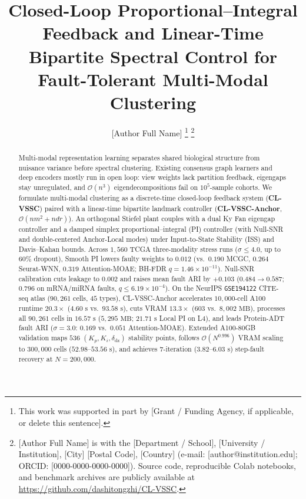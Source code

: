 \documentclass[journal]{IEEEtran}
\begin{document}
\title{Closed-Loop Proportional--Integral Feedback and Linear-Time Bipartite Spectral Control for Fault-Tolerant Multi-Modal Clustering}

\author{[Author Full Name]%
\thanks{This work was supported in part by [Grant / Funding Agency, if applicable, or delete this sentence].}%
\thanks{[Author Full Name] is with the [Department / School], [University / Institution], [City] [Postal Code], [Country] (e-mail: [author@institution.edu]; ORCID: [0000-0000-0000-0000]). Source code, reproducible Colab notebooks, and benchmark archives are publicly available at \url{https://github.com/dashitongzhi/CL-VSSC}.}}

\maketitle

\begin{abstract}
Multi-modal representation learning separates shared biological structure from nuisance variance before spectral clustering. Existing consensus graph learners and deep encoders mostly run in open loop: view weights lack partition feedback, eigengaps stay unregulated, and $\mathcal{O}(n^3)$ eigendecompositions fail on $10^5$-sample cohorts. We formulate multi-modal clustering as a discrete-time closed-loop feedback system (\textbf{CL-VSSC}) paired with a linear-time bipartite landmark controller (\textbf{CL-VSSC-Anchor}, $\mathcal{O}(nm^2+ndr)$). An orthogonal Stiefel plant couples with a dual Ky Fan eigengap controller and a damped simplex proportional--integral (PI) controller (with Null-SNR and double-centered Anchor-Local modes) under Input-to-State Stability (ISS) and Davis--Kahan bounds. Across $1{,}560$ TCGA three-modality stress runs ($\sigma\le 4.0$, up to $60\%$ dropout), Smooth PI lowers faulty weights to $0.012$ (vs.\ $0.190$ MCGC, $0.264$ Seurat-WNN, $0.319$ Attention-MOAE; BH-FDR $q=1.46\times 10^{-11}$). Null-SNR calibration cuts leakage to $0.002$ and raises mean fault ARI by $+0.103$ ($0.484 \rightarrow 0.587$; $0.796$ on mRNA/miRNA faults, $q \le 6.19\times 10^{-4}$). On the NeurIPS \texttt{GSE194122} CITE-seq atlas ($90{,}261$ cells, $45$ types), CL-VSSC-Anchor accelerates $10{,}000$-cell A100 runtime $20.3\times$ ($4.60\text{ s}$ vs.\ $93.58\text{ s}$), cuts VRAM $13.3\times$ ($603$ vs.\ $8{,}002\text{ MB}$), processes all $90{,}261$ cells in $16.57\text{ s}$ ($5{,}295\text{ MB}$; $21.71\text{ s}$ Local PI on L4), and leads Protein-ADT fault ARI ($\sigma=3.0$: $0.169$ vs.\ $0.051$ Attention-MOAE). Extended A100-80GB validation maps $536$ $(K_p,K_i,\delta_{\mathrm{dz}})$ stability points, follows $\mathcal{O}(N^{0.996})$ VRAM scaling to $300{,}000$ cells ($52.98\text{--}53.56\text{ s}$), and achieves $7$-iteration ($3.82\text{--}6.03\text{ s}$) step-fault recovery at $N=200{,}000$.
\end{abstract}
\end{document}
